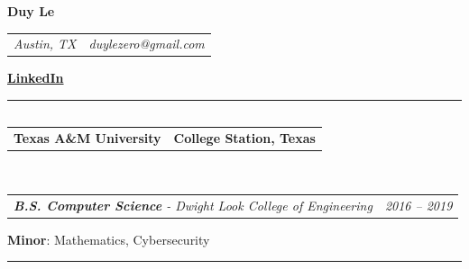\documentclass[11pt,letterpaper]{article}
\makeatletter
\newcommand{\headerrow}[2]
{\begin{tabular*}{\linewidth}{l@{\extracolsep{\fill}}r}
	#1 &
	#2 \\
\end{tabular*}}
\makeatother
\begin{document}
\begin{center}
{\LARGE \textbf{Duy Le}}
\vspace{0.6em}
\end{center}
	\headerrow
		{\emph{Austin, TX}}
		{\emph{duylezero@gmail.com}}
	\begin{center}
		\vspace{-1.8em}
		{\href{https://www.linkedin.com/in/duyhale/}{\textbf{LinkedIn}}}
	\end{center}
\hrule
\vspace{-0.4em}
\subsection*{}
	\vspace{-1em}
	\headerrow
		{\textbf{Texas A\&M University}}
		{\textbf{College Station, Texas}}
	\\
	\headerrow
		{\emph{\textbf{B.S. Computer Science} - Dwight Look College of Engineering}}
		{\emph{2016 -- 2019}}
	\vspace{-0.4em}
		 \textbf{Minor}: Mathematics, Cybersecurity \\

\hrule
\vspace{-0.8em}
\end{document}
